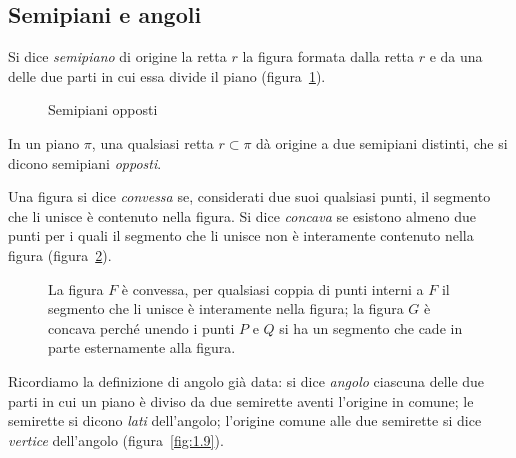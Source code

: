 
\subsection{Semipiani e angoli}

\begin{definizione}
Si dice \emph{semipiano} di origine la retta $r$ la figura formata 
dalla retta $r$ e da una delle due parti in cui essa divide il piano 
(figura~\ref{fig:1.17}).
\end{definizione}

\begin{inaccessibleblock}
 \begin{figure}[bth]
 \centering
  \caption{Semipiani opposti}\label{fig:1.17}
\end{figure}
\end{inaccessibleblock}
In un piano ${\pi}$, una qualsiasi retta $r \subset \pi$ dà origine a 
due semipiani distinti, che si dicono semipiani \emph{opposti}.

\begin{definizione}
Una figura si dice \emph{convessa} se, considerati due suoi qualsiasi 
punti, il segmento che li unisce è contenuto nella figura. Si dice 
\emph{concava} se esistono almeno due punti per i quali il segmento 
che li unisce non è interamente contenuto nella figura 
(figura~\ref{fig:1.18}).
\end{definizione}

\begin{inaccessibleblock}
 \begin{figure}[bth]
 \centering 
 \caption{La figura $ F $ è convessa, per qualsiasi coppia di punti 
interni a $ F $ il segmento che li unisce è interamente nella figura; 
la figura $ G $ è concava perché unendo i punti $ P $ e $ Q $ si ha 
un segmento che cade in parte esternamente alla 
figura.}\label{fig:1.18}
\end{figure}
\end{inaccessibleblock}

Ricordiamo la definizione di angolo già data: si dice \emph{angolo} 
ciascuna delle due parti in cui un piano è diviso da due semirette 
aventi l'origine in comune; le semirette si dicono \emph{lati} 
dell'angolo; l'origine comune alle due semirette si dice 
\emph{vertice} dell'angolo (figura~\ref{fig:1.9}).

